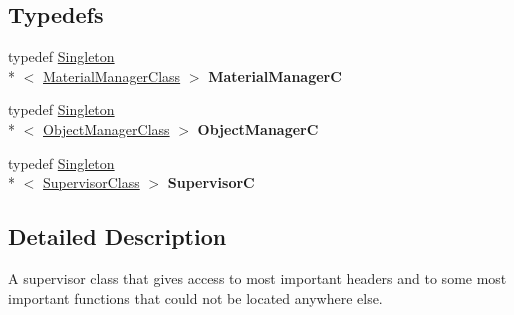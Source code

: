 \subsection*{Typedefs}
\begin{DoxyCompactItemize}
\item 
\hypertarget{namespace_swift_a6211724086aeb00373d8de19c782ceff}{typedef \hyperlink{class_singleton}{Singleton}\\*
$<$ \hyperlink{class_swift_1_1_material_manager_class}{Material\-Manager\-Class} $>$ {\bfseries Material\-Manager\-C}}\label{namespace_swift_a6211724086aeb00373d8de19c782ceff}

\item 
\hypertarget{namespace_swift_a02c729c7865931e2de192dcdcc45baad}{typedef \hyperlink{class_singleton}{Singleton}\\*
$<$ \hyperlink{class_swift_1_1_object_manager_class}{Object\-Manager\-Class} $>$ {\bfseries Object\-Manager\-C}}\label{namespace_swift_a02c729c7865931e2de192dcdcc45baad}

\item 
\hypertarget{namespace_swift_ad02e1e33f2cfaeba80c52a1943f5bac4}{typedef \hyperlink{class_singleton}{Singleton}\\*
$<$ \hyperlink{class_swift_1_1_supervisor_class}{Supervisor\-Class} $>$ {\bfseries Supervisor\-C}}\label{namespace_swift_ad02e1e33f2cfaeba80c52a1943f5bac4}

\end{DoxyCompactItemize}


\subsection{Detailed Description}
A supervisor class that gives access to most important headers and to some most important functions that could not be located anywhere else. 